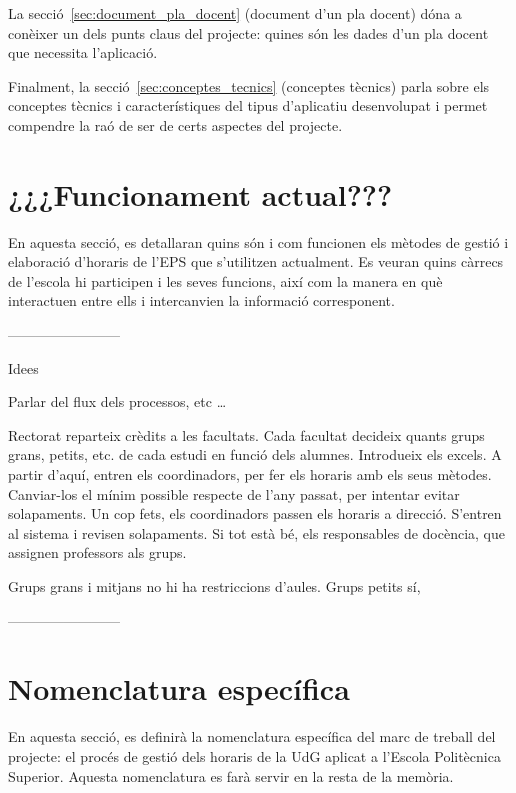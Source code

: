\documentclass[a4paper,12pt]{ThesisStyle}
\begin{document}
La secció~\ref{sec:document_pla_docent} (document d'un pla docent) dóna a conèixer un dels punts claus del projecte: quines són les dades d'un pla docent que necessita l'aplicació.

Finalment, la secció~\ref{sec:conceptes_tecnics} (conceptes tècnics) parla sobre els conceptes tècnics i característiques del tipus d'aplicatiu desenvolupat i permet compendre la raó de ser de certs aspectes del projecte.

\section{¿¿¿Funcionament actual???}
\label{sec:funcionament_actual}

En aquesta secció, es detallaran quins són i com funcionen els mètodes de gestió i elaboració d'horaris de l'EPS que s'utilitzen actualment. Es veuran quins càrrecs de l'escola hi participen i les seves funcions, així com la manera en què interactuen entre ells i intercanvien la informació corresponent.

------------------------

Idees

Parlar del flux dels processos, etc \ldots

Rectorat reparteix crèdits a les facultats. Cada facultat decideix quants grups grans, petits, etc. de cada estudi en funció dels alumnes. Introdueix els excels.
A partir d'aquí, entren els coordinadors, per fer els horaris amb els seus mètodes. Canviar-los el mínim possible respecte de l'any passat, per intentar evitar
solapaments. Un cop fets, els coordinadors passen els horaris a direcció. S'entren al sistema i revisen solapaments. Si tot està bé, els responsables de docència,
que assignen professors als grups.

Grups grans i mitjans no hi ha restriccions d'aules. Grups petits sí,

------------------------

\section{Nomenclatura específica}
\label{sec:nomenclatura}

En aquesta secció, es definirà la nomenclatura específica del marc de treball del projecte: el procés de gestió dels horaris de la UdG aplicat a l'Escola Politècnica Superior. Aquesta nomenclatura es farà servir en la resta de la memòria.
\end{document}
